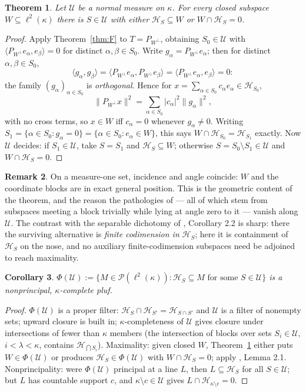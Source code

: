 \documentclass[11pt,reqno]{amsart}
\newtheorem{theorem}{Theorem}[section]
\newtheorem{corollary}[theorem]{Corollary}
\theoremstyle{definition}
\newtheorem{remark}[theorem]{Remark}
\newcommand{\HH}{\mathcal{H}}
\newcommand{\PP}{\mathcal{P}}
\newcommand{\U}{\mathcal{U}}
\newcommand{\lk}{\ell^2(\kappa)}
\begin{document}
\begin{theorem}\label{thm:G}
Let $\U$ be a normal measure on $\kappa$. For every closed subspace $W\subseteq\lk$
there is $S\in\U$ with either $\HH_S\subseteq W$ or $W\cap\HH_S=0$.
\end{theorem}

\begin{proof}
Apply Theorem~\ref{thm:F} to $T=P_{W^\perp}$, obtaining $S_0\in\U$ with
$\langle P_{W^\perp}e_\alpha,e_\beta\rangle=0$ for distinct $\alpha,\beta\in S_0$.
Write $g_\alpha=P_{W^\perp}e_\alpha$; then for distinct $\alpha,\beta\in S_0$,
\[
\langle g_\alpha,g_\beta\rangle
=\langle P_{W^\perp}e_\alpha,P_{W^\perp}e_\beta\rangle
=\langle P_{W^\perp}e_\alpha,e_\beta\rangle=0:
\]
the family $(g_\alpha)_{\alpha\in S_0}$ is \emph{orthogonal}. Hence for
$x=\sum_{\alpha\in S_0}c_\alpha e_\alpha\in\HH_{S_0}$,
\[
\|P_{W^\perp}x\|^2=\sum_{\alpha\in S_0}|c_\alpha|^2\|g_\alpha\|^2,
\]
with no cross terms, so $x\in W$ iff $c_\alpha=0$ whenever $g_\alpha\neq0$. Writing
$S_1=\{\alpha\in S_0:g_\alpha=0\}=\{\alpha\in S_0:e_\alpha\in W\}$, this says
$W\cap\HH_{S_0}=\HH_{S_1}$ exactly. Now $\U$ decides: if $S_1\in\U$, take $S=S_1$ and
$\HH_S\subseteq W$; otherwise $S=S_0\setminus S_1\in\U$ and $W\cap\HH_S=0$.
\end{proof}

\begin{remark}
On a measure-one set, incidence and angle coincide: $W$ and the coordinate blocks are
in exact general position. This is the geometric content of the theorem, and the reason
the pathologies of \cite{FWI,FWII} --- all of which stem from subspaces meeting a block
trivially while lying at angle zero to it --- vanish along $\U$. The contrast with the
separable dichotomy of \cite{FWII}, Corollary 2.2 is sharp: there the surviving
alternative is \emph{finite codimension in} $\HH_S$; here it is containment of $\HH_S$
on the nose, and no auxiliary finite-codimension subspaces need be adjoined to reach
maximality.
\end{remark}

\begin{corollary}\label{cor:H}
$\Phi(\U):=\{M\in\PP(\lk):\HH_S\subseteq M\text{ for some }S\in\U\}$ is a nonprincipal,
$\kappa$-complete pluf.
\end{corollary}

\begin{proof}
$\Phi(\U)$ is a proper filter: $\HH_S\cap\HH_{S'}=\HH_{S\cap S'}$ and $\U$ is a filter
of nonempty sets; upward closure is built in; $\kappa$-completeness of $\U$ gives
closure under intersections of fewer than $\kappa$ members (the intersection of blocks
over sets $S_i\in\U$, $i<\lambda<\kappa$, contains
$\HH_{\bigcap S_i}$). Maximality: given closed $W$, Theorem~\ref{thm:G} either puts
$W\in\Phi(\U)$ or produces $\HH_S\in\Phi(\U)$ with $W\cap\HH_S=0$; apply \cite{FWI},
Lemma 2.1. Nonprincipality: were $\Phi(\U)$ principal at a line $L$, then $L\subseteq
\HH_S$ for all $S\in\U$; but $L$ has countable support $c$, and
$\kappa\setminus c\in\U$ gives $L\cap\HH_{\kappa\setminus c}=0$.
\end{proof}
\end{document}
